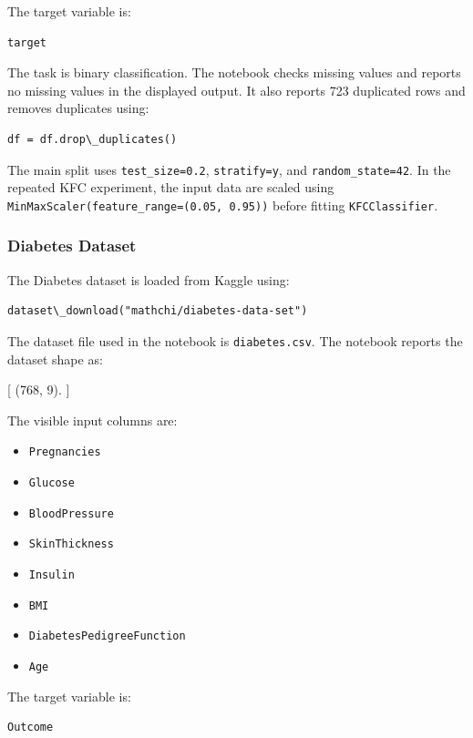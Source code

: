 The target variable is:

\begin{verbatim}
target
\end{verbatim}

The task is binary classification. The notebook checks missing values and reports no missing values in the displayed output. It also reports 723 duplicated rows and removes duplicates using:

\begin{verbatim}
df = df.drop\_duplicates()
\end{verbatim}

The main split uses \texttt{test\_size=0.2}, \texttt{stratify=y}, and \texttt{random\_state=42}. In the repeated KFC experiment, the input data are scaled using \texttt{MinMaxScaler(feature\_range=(0.05, 0.95))} before fitting \texttt{KFCClassifier}.

\subsubsection{Diabetes Dataset}

The Diabetes dataset is loaded from Kaggle using:

\begin{verbatim}
dataset\_download("mathchi/diabetes-data-set")
\end{verbatim}

The dataset file used in the notebook is \texttt{diabetes.csv}. The notebook reports the dataset shape as:

[
    (768, 9).
]

The visible input columns are:

\begin{itemize}
    \item \texttt{Pregnancies}
    \item \texttt{Glucose}
    \item \texttt{BloodPressure}
    \item \texttt{SkinThickness}
    \item \texttt{Insulin}
    \item \texttt{BMI}
    \item \texttt{DiabetesPedigreeFunction}
    \item \texttt{Age}
\end{itemize}

The target variable is:

\begin{verbatim}
Outcome
\end{verbatim}

